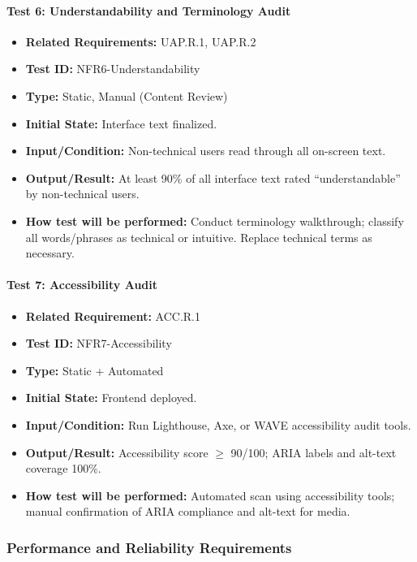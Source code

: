 \documentclass[12pt, titlepage]{article}
\begin{document}
\paragraph{Test 6: Understandability and Terminology Audit}
\begin{itemize}
    \item \textbf{Related Requirements:} UAP.R.1, UAP.R.2
    \item \textbf{Test ID:} NFR6-Understandability
    \item \textbf{Type:} Static, Manual (Content Review)
    \item \textbf{Initial State:} Interface text finalized.
    \item \textbf{Input/Condition:} Non-technical users read through all on-screen text.
    \item \textbf{Output/Result:} At least 90\% of all interface text rated “understandable” by non-technical users.
    \item \textbf{How test will be performed:} Conduct terminology walkthrough; classify all words/phrases as technical or intuitive. Replace technical terms as necessary.
\end{itemize}

\paragraph{Test 7: Accessibility Audit}
\begin{itemize}
    \item \textbf{Related Requirement:} ACC.R.1
    \item \textbf{Test ID:} NFR7-Accessibility
    \item \textbf{Type:} Static + Automated
    \item \textbf{Initial State:} Frontend deployed.
    \item \textbf{Input/Condition:} Run Lighthouse, Axe, or WAVE accessibility audit tools.
    \item \textbf{Output/Result:} Accessibility score $\geq$ 90/100; ARIA labels and alt-text coverage 100\%.
    \item \textbf{How test will be performed:} Automated scan using accessibility tools; manual confirmation of ARIA compliance and alt-text for media.
\end{itemize}

\subsubsection{Performance and Reliability Requirements}
\end{document}
